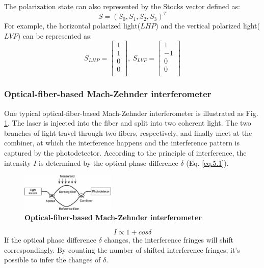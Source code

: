 \documentclass[10pt,a4paper,twocolumn,twoside,UTF8]{article}
\begin{document}
		The polarization state can also represented by the Stocks vector defined as: 
		\begin{equation}
			S=(S_0, S_1, S_2, S_3)^T
			\label{eq.4.6}
		\end{equation}
		For example, the horizontal polarized light($LHP$) and the vertical polarized light($LVP$) can be represented as:
		\begin{equation*}
		S_{LHP} = 
			\begin{bmatrix}
				1 \\
				1 \\
				0 \\
				0 \\
			\end{bmatrix}, \
		S_{LVP} = 
			\begin{bmatrix}
				1 \\
				-1 \\
				0 \\
				0 \\
			\end{bmatrix}
		\end{equation*}
		\subsubsection{Optical-fiber-based Mach-Zehnder interferometer}
		One typical optical-fiber-based Mach-Zehnder interferometer is illustrated as Fig. \ref{fig.illus-4.1}. 
		The laser is injected into the fiber and split into two coherent light. 
		The two branches of light travel through two fibers, respectively, and finally meet at the combiner, at which the interference happens and the interference pattern is captured by the photodetector. 
		According to the principle of interference, the intensity $I$ is determined by the optical phase difference $\delta$ (Eq. \ref{eq.5.1}).
		\begin{figure}[htbp]
			\centering
			\includegraphics[width=0.4\textwidth]{attachments/illus-4.1.png}
			\caption{\textbf{Optical-fiber-based Mach-Zehnder interferometer}}
			\label{fig.illus-4.1}
		\end{figure}
		
		\begin{equation}
			I \propto 1+cos\delta
			\label{eq.5.1}
		\end{equation}
		If the optical phase difference $\delta$ changes, the interference fringes will shift correspondingly. By counting the number of shifted interference fringes, it's possible to infer the changes of $\delta$. 
\end{document}
